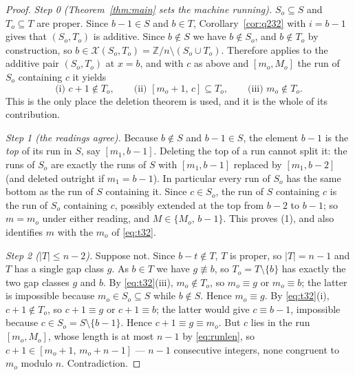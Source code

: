 \documentclass[11pt]{article}
\theoremstyle{definition}
\newcommand{\Z}{\mathbb{Z}}
\newcommand{\XX}{\mathcal{X}}
\begin{document}
\begin{proof}
\emph{Step 0 (Theorem~\ref{thm:main} sets the machine running).} $S_o\subseteq S$ and
$T_o\subseteq T$ are proper. Since $b-1\in S$ and $b\in T$, Corollary~\ref{cor:q232} with
$i=b-1$ gives that $(S_o,T_o)$ is additive. Since $b\notin S$ we have $b\notin S_o$, and
$b\notin T_o$ by construction, so $b\in\XX(S_o,T_o)=\Z/n\setminus(S_o\cup T_o)$. Therefore
\cite[Thm.~3.2]{Clio3} applies to the additive pair $(S_o,T_o)$ at $x=b$, and with $c$ as above
and $[m_o,M_o]$ the run of $S_o$ containing $c$ it yields
\begin{equation}\label{eq:t32}
  \text{(i) } c+1\notin T_o,\qquad
  \text{(ii) } [m_o+1,\,c]\subseteq T_o,\qquad
  \text{(iii) } m_o\notin T_o .
\end{equation}
This is the only place the deletion theorem is used, and it is the whole of its contribution.

\emph{Step 1 (the readings agree).} Because $b\notin S$ and $b-1\in S$, the element $b-1$ is the
\emph{top} of its run in $S$, say $[m_1,b-1]$. Deleting the top of a run cannot split it: the
runs of $S_o$ are exactly the runs of $S$ with $[m_1,b-1]$ replaced by $[m_1,b-2]$ (and deleted
outright if $m_1=b-1$). In particular every run of $S_o$ has the same bottom as the run of $S$
containing it. Since $c\in S_o$, the run of $S$ containing $c$ is the run of $S_o$ containing
$c$, possibly extended at the top from $b-2$ to $b-1$; so $m=m_o$ under either reading, and
$M\in\{M_o,\,b-1\}$. This proves (1), and also identifies $m$ with the $m_o$ of \eqref{eq:t32}.

\emph{Step 2 ($|T|\le n-2$).} Suppose not. Since $b-t\notin T$, $T$ is proper, so $|T|=n-1$ and
$T$ has a single gap class $g$. As $b\in T$ we have $g\not\equiv b$, so $T_o=T\setminus\{b\}$
has exactly the two gap classes $g$ and $b$. By \eqref{eq:t32}(iii), $m_o\notin T_o$, so
$m_o\equiv g$ or $m_o\equiv b$; the latter is impossible because $m_o\in S_o\subseteq S$ while
$b\notin S$. Hence $m_o\equiv g$. By \eqref{eq:t32}(i), $c+1\notin T_o$, so $c+1\equiv g$ or
$c+1\equiv b$; the latter would give $c\equiv b-1$, impossible because $c\in S_o=S\setminus\{b-1\}$.
Hence $c+1\equiv g\equiv m_o$. But $c$ lies in the run $[m_o,M_o]$, whose length is at most
$n-1$ by \eqref{eq:runlen}, so $c+1\in[m_o+1,\,m_o+n-1]$ --- $n-1$ consecutive integers, none
congruent to $m_o$ modulo $n$. Contradiction.


\end{proof}
\end{document}
